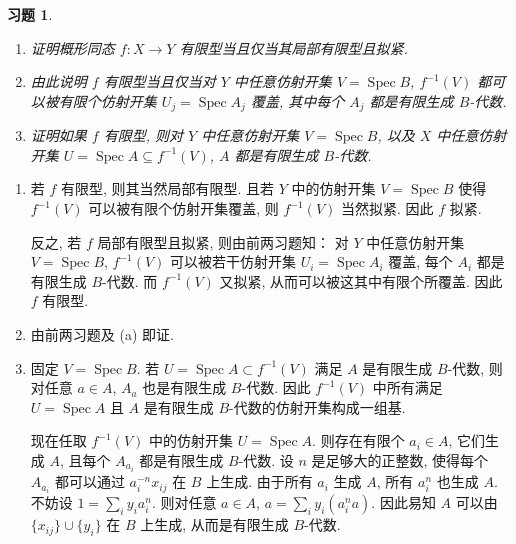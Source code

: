 \documentclass{article}
\theoremstyle{exercise}
\newtheorem{exercise}{习题}[section]
\newenvironment{proofc}{\proof}{\endproof}
\def\Spec{\operatorname{Spec}}
\begin{document}
\begin{exercise}
  \begin{enumerate}[label={(\alph*)}]
    \item 证明概形同态 $f \colon X \to Y$ 有限型当且仅当其局部有限型且拟紧.
    \item 由此说明 $f$ 有限型当且仅当对 $Y$ 中\emph{任意}仿射开集 $V = \Spec B$,
          $f^{-1}(V)$ 都可以被有限个仿射开集 $U_j = \Spec A_j$ 覆盖,
          其中每个 $A_j$ 都是有限生成 $B$-代数.
    \item 证明如果 $f$ 有限型, 则对 $Y$ 中\emph{任意}仿射开集 $V = \Spec B$,
          以及 $X$ 中任意仿射开集 $U = \Spec A \subseteq f^{-1}(V)$,
          $A$ 都是有限生成 $B$-代数.
  \end{enumerate}
\end{exercise}

\begin{proofc}
  \begin{enumerate}[label={(\alph*)}]
    \item 若 $f$ 有限型, 则其当然局部有限型.
          且若 $Y$ 中的仿射开集 $V = \Spec B$ 使得 $f^{-1}(V)$ 可以被有限个仿射开集覆盖,
          则 $f^{-1}(V)$ 当然拟紧. 因此 $f$ 拟紧.

          反之, 若 $f$ 局部有限型且拟紧, 则由前两习题知：
          对 $Y$ 中任意仿射开集 $V = \Spec B$,
          $f^{-1}(V)$ 可以被若干仿射开集 $U_i = \Spec A_i$ 覆盖,
          每个 $A_i$ 都是有限生成 $B$-代数. 而 $f^{-1}(V)$ 又拟紧, 从而可以被这其中有限个所覆盖.
          因此 $f$ 有限型.
    \item 由前两习题及 (a) 即证.
    \item 固定 $V = \Spec B$. 若 $U = \Spec A \subset f^{-1}(V)$ 满足 $A$ 是有限生成 $B$-代数,
          则对任意 $a \in A$, $A_a$ 也是有限生成 $B$-代数.
          因此 $f^{-1}(V)$ 中所有满足 $U = \Spec A$ 且 $A$ 是有限生成 $B$-代数的仿射开集构成一组基.

          现在任取 $f^{-1}(V)$ 中的仿射开集 $U = \Spec A$.
          则存在有限个 $a_i \in A$, 它们生成 $A$, 且每个 $A_{a_i}$ 都是有限生成 $B$-代数.
          设 $n$ 是足够大的正整数, 使得每个 $A_{a_i}$ 都可以通过 $a_i^{-n} x_{ij}$ 在 $B$ 上生成.
          由于所有 $a_i$ 生成 $A$, 所有 $a_i^n$ 也生成 $A$.
          不妨设 $1 = \sum_i y_i a_i^n$. 则对任意 $a \in A$, $a = \sum_i y_i (a_i^n a)$.
          因此易知 $A$ 可以由 $\{ x_{ij} \} \cup \{ y_i \}$ 在 $B$ 上生成, 从而是有限生成 $B$-代数.
          \qedhere
  \end{enumerate}
\end{proofc}
\end{document}
